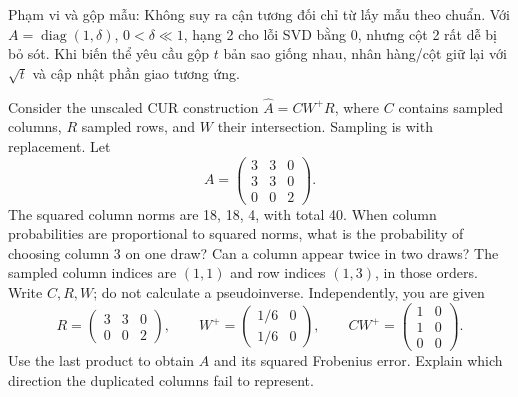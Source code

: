 \documentclass[10pt,a4paper,twocolumn]{article}
\newcommand{\key}[1]{#1:\enspace}
\begin{document}
\key{Phạm vi và gộp mẫu} Không suy ra cận tương đối chỉ từ lấy mẫu theo chuẩn. Với $A=\operatorname{diag}(1,\delta)$, $0<\delta\ll1$, hạng 2 cho lỗi SVD bằng 0, nhưng cột 2 rất dễ bị bỏ sót. Khi biến thể yêu cầu gộp $t$ bản sao giống nhau, nhân hàng/cột giữ lại với $\sqrt t$ và cập nhật phần giao tương ứng.


Consider the unscaled CUR construction $\hat A=CW^+R$, where $C$ contains sampled columns, $R$ sampled rows, and $W$ their intersection. Sampling is with replacement. Let
\[
A=\begin{pmatrix}3&3&0\\3&3&0\\0&0&2\end{pmatrix}.
\]
The squared column norms are 18, 18, 4, with total 40.
 When column probabilities are proportional to squared norms, what is the probability of choosing column 3 on one draw? Can a column appear twice in two draws?
 The sampled column indices are $(1,1)$ and row indices $(1,3)$, in those orders. Write $C,R,W$; do not calculate a pseudoinverse.
 Independently, you are given
\[
R=\begin{pmatrix}3&3&0\\0&0&2\end{pmatrix},\qquad
W^+=\begin{pmatrix}1/6&0\\1/6&0\end{pmatrix},\qquad
CW^+=\begin{pmatrix}1&0\\1&0\\0&0\end{pmatrix}.
\]
Use the last product to obtain $\hat A$ and its squared Frobenius error. Explain which direction the duplicated columns fail to represent.
\end{document}
